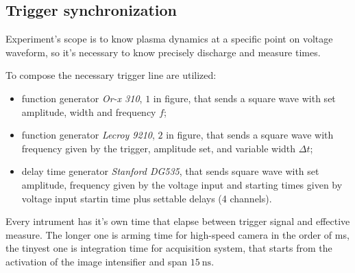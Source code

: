 \subsection{Trigger synchronization}
Experiment's scope is to know plasma dynamics at a specific point on voltage waveform, so it's necessary to know precisely discharge and measure times.

To compose the necessary trigger line are utilized:
\begin{itemize}
 \item function generator \emph{Or-x 310}, $1$ in figure, that sends a square wave with set amplitude, width and frequency $f$;
 \item function generator \emph{Lecroy 9210}, $2$ in figure, that sends a square wave with frequency given by the trigger, amplitude set, and variable width $\Delta t$;
 \item delay time generator \emph{Stanford DG535}, that sends square wave with set amplitude, frequency given by the voltage input and starting times given by voltage input startin time plus settable delays (4 channels).
\end{itemize}

Every intrument has it's own time that elapse between trigger signal and effective measure. The longer one is arming time for high-speed camera in the order of \si{\milli\second}, the tinyest one is integration time for acquisition system, that starts from the activation of the image intensifier and span $\SI{15}{\nano\second}$.

